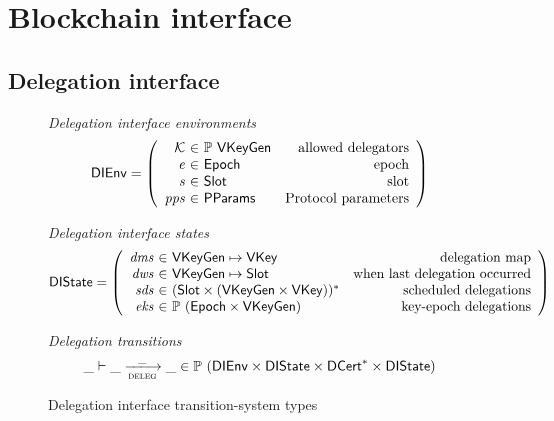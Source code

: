 \section{Blockchain interface}
\label{sec:blockchain-interface}

\newcommand{\DIEnv}{\type{DIEnv}}
\newcommand{\DIState}{\type{DIState}}

\newcommand{\UPIEnv}{\type{UPIEnv}}
\newcommand{\UPIState}{\type{UPIState}}

\subsection{Delegation interface}
\label{sec:delegation-interface}

\begin{figure}[htb]
  \emph{Delegation interface environments}
  \begin{equation*}
    \DIEnv =
    \left(
      \begin{array}{r@{~\in~}lr}
        \mathcal{K} & \powerset{\VKeyGen} & \text{allowed delegators}\\
        \var{e} & \Epoch & \text{epoch}\\
        \var{s} & \Slot & \text{slot}\\
        \var{pps} & \PPMMap & \text{Protocol parameters}
      \end{array}
    \right)
  \end{equation*}

  \emph{Delegation interface states}
  \begin{equation*}
    \DIState
    = \left(
      \begin{array}{r@{~\in~}lr}
        \var{dms} & \VKeyGen \mapsto \VKey & \text{delegation map}\\
        \var{dws} & \VKeyGen \mapsto \Slot & \text{when last delegation occurred}\\
        \var{sds} & \seqof{(\Slot \times (\VKeyGen \times \VKey))} & \text{scheduled delegations}\\
        \var{eks} & \powerset{(\Epoch \times \VKeyGen)} & \text{key-epoch delegations}
      \end{array}
    \right)
  \end{equation*}

  \emph{Delegation transitions}
  \begin{equation*}
    \_ \vdash \_ \trans{deleg}{\_} \_ \in
    \powerset (\DIEnv \times \DIState \times \seqof{\DCert} \times \DIState)
  \end{equation*}
  \caption{Delegation interface transition-system types}
  \label{fig:ts-types:delegation-interface}
\end{figure}

